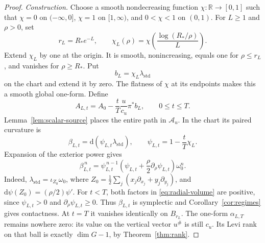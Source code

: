 \documentclass[10pt,a4paper]{amsart}
\newcommand{\R}{\mathbb R}
\newcommand{\dd}{\mathrm d}
\begin{document}
\begin{proof}
\smallskip\noindent
\emph{Construction.}
Choose a smooth nondecreasing function $\chi:\R\to[0,1]$ such that
$\chi=0$ on $(-\infty,0]$, $\chi=1$ on $[1,\infty)$, and $0<\chi<1$ on $(0,1)$.
For $L\geq1$ and $\rho>0$, set
\begin{equation}\label{eq:log-cutoff}
 r_L=R_*e^{-L},\qquad
 \chi_L(\rho)=\chi\!\left(\frac{\log(R_*/\rho)}{L}\right).
\end{equation}
Extend $\chi_L$ by one at the origin. It is smooth, nonincreasing, equals
one for $\rho\leq r_L$, and vanishes for $\rho\geq R_*$. Put
\[
 b_L=\chi_L\lambda_{\mathrm{std}}
\]
on the chart and extend it by zero. The flatness of $\chi$ at its endpoints
makes this a smooth global one-form. Define
\begin{equation}\label{eq:critical-path}
 A_{L,t}=A_0-\frac{t}{T}\frac{u}{c_u}\pi^*b_L,
 \qquad 0\leq t\leq T.
\end{equation}
Lemma~\ref{lem:scalar-source} places the entire path in $\mathcal A_u$.
In the chart its paired curvature is
\[
 \beta_{L,t}=\dd(\psi_{L,t}\lambda_{\mathrm{std}}),\qquad
 \psi_{L,t}=1-\frac{t}{T}\chi_L.
\]
Expansion of the exterior power gives
\begin{equation}\label{eq:radial-volume}
 \beta_{L,t}^{\,n}
 =\psi_{L,t}^{\,n-1}
   \left(\psi_{L,t}+\frac{\rho}{2}\partial_\rho \psi_{L,t}\right)
      \omega_0^n.
\end{equation}
Indeed,
$\lambda_{\mathrm{std}}=\iota_{Z_0}\omega_0$, where
$Z_0=\frac12\sum_j(x_j\partial_{x_j}+y_j\partial_{y_j})$, and
$\dd\psi(Z_0)=(\rho/2)\psi'$. For $t<T$, both factors in
\eqref{eq:radial-volume} are positive, since $\psi_{L,t}>0$ and
$\partial_\rho \psi_{L,t}\geq0$. Thus $\beta_{L,t}$ is symplectic and
Corollary~\ref{cor:regimes} gives contactness. At $t=T$ it vanishes
identically on $B_{r_L}$. The one-form $\alpha_{L,T}$ remains nowhere zero:
its value on the vertical vector $u^\#$ is still $c_u$. Its Levi rank on
that ball is exactly $\dim G-1$, by Theorem~\ref{thm:rank}.


\end{proof}
\end{document}
